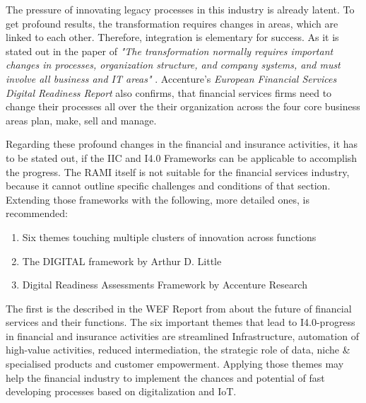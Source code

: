 The pressure of innovating legacy processes in this industry is already latent. To get profound results, the transformation requires changes in areas, which are linked to each other. Therefore, integration is elementary for success. As it is stated out in the paper of \citeauthor{ArthurDLittle-FinancialService} \emph{"The transformation normally requires important changes in processes, organization structure, and company systems, and must involve all business and IT areas"} \cite[p.4 ]{ArthurDLittle-FinancialService}. Accenture's \emph{European Financial Services Digital Readiness Report} also confirms, that financial services firms need to change their processes all over the their organization across the four core business areas plan, make, sell and manage. \cite[p. 9]{accenture-europeanFinancialServices-digitalReadinessReport}

Regarding these profound changes in the financial and insurance activities, it has to be stated out, if the \ac{IIC} and \ac{I4.0} Frameworks can be applicable to accomplish the progress. The \ac{RAMI} itself is not suitable for the financial services industry, because it cannot outline specific challenges and conditions of that section. Extending those frameworks with the following, more detailed ones, is recommended:

\begin{enumerate}
\item Six themes touching multiple clusters of innovation across functions \cite{WEF-futureFinancialServices}
\item The DIGITAL framework by Arthur D. Little \cite[]{ArthurDLittle-FinancialService}
\item Digital Readiness Assessments Framework by Accenture Research \cite{accenture-europeanFinancialServices-digitalReadinessReport}
\end{enumerate}

The first is the described in the \ac{WEF} Report \cite{WEF-futureFinancialServices} from \citeauthor{WEF-futureFinancialServices} about the future of financial services and their functions. The six important themes that lead to \ac{I4.0}-progress in financial and insurance activities are streamlined Infrastructure, automation of high-value activities, reduced intermediation, the strategic role of data, niche \& specialised products and customer empowerment. Applying those themes may help the financial industry to implement the chances and potential of fast developing processes based on digitalization and \ac{IoT}.

